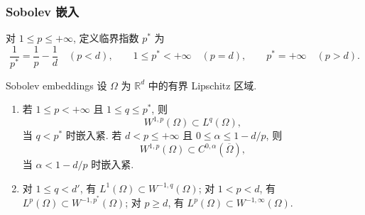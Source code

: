 \subsubsection{Sobolev 嵌入}
\label{subsec:chap3-sobolev-embeddings}

\begin{Definition}
\label{def:chap3-critical-exponent}
对 $1\leq p\leq+\infty$, 定义临界指数 $p^*$ 为
\[
 \frac1{p^*}=\frac1p-\frac1d\quad(p<d),
 \qquad 1\leq p^*<+\infty\quad(p=d),
 \qquad p^*=+\infty\quad(p>d).
\]
\end{Definition}

\begin{Theorem}{Sobolev embeddings}
\label{thm:chap3-sobolev-embeddings}
设 $\Omega$ 为 $\mathbb R^d$ 中的有界 Lipschitz 区域.
\begin{enumerate}
\item 若 $1\leq p<+\infty$ 且 $1\leq q\leq p^*$, 则
\begin{equation}
 W^{1,p}(\Omega)\subset L^q(\Omega),
 \label{eq:chap3-sobolev-lq-embedding}
\end{equation}
当 $q<p^*$ 时嵌入紧. 若 $d<p\leq+\infty$ 且 $0\leq\alpha\leq1-d/p$, 则
\begin{equation}
 W^{1,p}(\Omega)\subset C^{0,\alpha}(\overline\Omega),
 \label{eq:chap3-sobolev-holder-embedding}
\end{equation}
当 $\alpha<1-d/p$ 时嵌入紧.
\item 对 $1\leq q<d'$, 有 $L^1(\Omega)\subset W^{-1,q}(\Omega)$; 对 $1<p<d$, 有 $L^p(\Omega)\subset W^{-1,p^*}(\Omega)$; 对 $p\geq d$, 有 $L^p(\Omega)\subset W^{-1,\infty}(\Omega)$.
\end{enumerate}
\end{Theorem}

